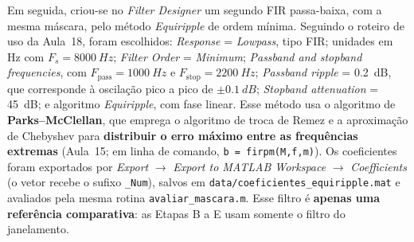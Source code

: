 \documentclass[11pt,a4paper]{article}
\begin{document}
Em seguida, criou-se no \textit{Filter Designer} um segundo FIR passa-baixa, com a mesma máscara, pelo método \textit{Equiripple} de ordem mínima. Seguindo o roteiro de uso da Aula~18, foram escolhidos: \textit{Response} = \textit{Lowpass}, tipo FIR; unidades em \si{Hz} com $F_s = \SI{8000}{Hz}$; \textit{Filter Order} = \textit{Minimum}; \textit{Passband and stopband frequencies}, com $F_{\text{pass}} = \SI{1000}{Hz}$ e $F_{\text{stop}} = \SI{2200}{Hz}$; \textit{Passband ripple} = \SI{0,2}{dB}, que corresponde à oscilação pico a pico de $\pm\SI{0,1}{dB}$; \textit{Stopband attenuation} = \SI{45}{dB}; e algoritmo \textit{Equiripple}, com fase linear. Esse método usa o algoritmo de \textbf{Parks--McClellan}, que emprega o algoritmo de troca de Remez e a aproximação de Chebyshev para \textbf{distribuir o erro máximo entre as frequências extremas} (Aula~15; em linha de comando, \texttt{b = firpm(M,f,m)}). Os coeficientes foram exportados por \textit{Export} $\to$ \textit{Export to MATLAB Workspace} $\to$ \textit{Coefficients} (o vetor recebe o sufixo \texttt{\_Num}), salvos em \texttt{data/coeficientes\_equiripple.mat} e avaliados pela mesma rotina \texttt{avaliar\_mascara.m}. Esse filtro é \textbf{apenas uma referência comparativa}: as Etapas B a E usam somente o filtro do janelamento.
\end{document}
